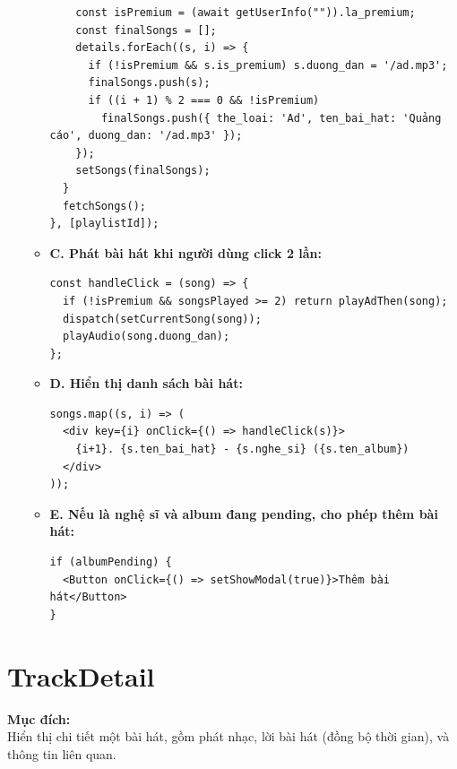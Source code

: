 \begin{enumerate}
\begin{itemize}
\begin{verbatim}
    const isPremium = (await getUserInfo("")).la_premium;
    const finalSongs = [];
    details.forEach((s, i) => {
      if (!isPremium && s.is_premium) s.duong_dan = '/ad.mp3';
      finalSongs.push(s);
      if ((i + 1) % 2 === 0 && !isPremium)
        finalSongs.push({ the_loai: 'Ad', ten_bai_hat: 'Quảng cáo', duong_dan: '/ad.mp3' });
    });
    setSongs(finalSongs);
  }
  fetchSongs();
}, [playlistId]);
\end{verbatim}

  \item \textbf{C. Phát bài hát khi người dùng click 2 lần:}
\begin{verbatim}
const handleClick = (song) => {
  if (!isPremium && songsPlayed >= 2) return playAdThen(song);
  dispatch(setCurrentSong(song));
  playAudio(song.duong_dan);
};
\end{verbatim}


  \item \textbf{D. Hiển thị danh sách bài hát:}
\begin{verbatim}
songs.map((s, i) => (
  <div key={i} onClick={() => handleClick(s)}>
    {i+1}. {s.ten_bai_hat} - {s.nghe_si} ({s.ten_album})
  </div>
));
\end{verbatim}

  \item \textbf{E. Nếu là nghệ sĩ và album đang pending, cho phép thêm bài hát:}
\begin{verbatim}
if (albumPending) {
  <Button onClick={() => setShowModal(true)}>Thêm bài hát</Button>
}
\end{verbatim}
\end{itemize}

\end{enumerate}

\section{TrackDetail}

\textbf{Mục đích:} \\
Hiển thị chi tiết một bài hát, gồm phát nhạc, lời bài hát (đồng bộ thời gian), và thông tin liên quan.

